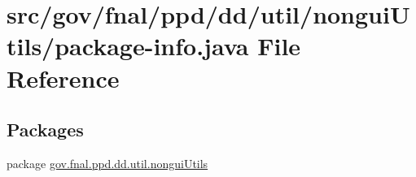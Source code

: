 \hypertarget{gov_2fnal_2ppd_2dd_2util_2nonguiUtils_2package-info_8java}{\section{src/gov/fnal/ppd/dd/util/nongui\-Utils/package-\/info.java File Reference}
\label{gov_2fnal_2ppd_2dd_2util_2nonguiUtils_2package-info_8java}
}
\subsection*{Packages}
\begin{DoxyCompactItemize}
\item 
package \hyperlink{namespacegov_1_1fnal_1_1ppd_1_1dd_1_1util_1_1nonguiUtils}{gov.\-fnal.\-ppd.\-dd.\-util.\-nongui\-Utils}
\end{DoxyCompactItemize}
